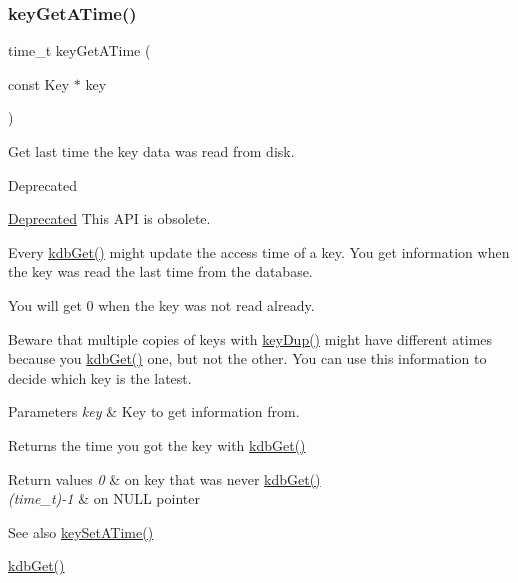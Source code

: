 \subsubsection{\texorpdfstring{keyGetATime()}{keyGetATime()}}
{\footnotesize\ttfamily time\+\_\+t key\+Get\+A\+Time (\begin{DoxyParamCaption}\item[{const Key $\ast$}]{key }\end{DoxyParamCaption})}



Get last time the key data was read from disk. 

\begin{DoxyRefDesc}{Deprecated}
\item[\mbox{\hyperlink{deprecated__deprecated000021}{Deprecated}}]This A\+PI is obsolete.\end{DoxyRefDesc}


Every \mbox{\hyperlink{group__kdb_ga28e385fd9cb7ccfe0b2f1ed2f62453a1}{kdb\+Get()}} might update the access time of a key. You get information when the key was read the last time from the database.

You will get 0 when the key was not read already.

Beware that multiple copies of keys with \mbox{\hyperlink{group__key_gae6ec6a60cc4b8c1463fa08623d056ce3}{key\+Dup()}} might have different atimes because you \mbox{\hyperlink{group__kdb_ga28e385fd9cb7ccfe0b2f1ed2f62453a1}{kdb\+Get()}} one, but not the other. You can use this information to decide which key is the latest.


\begin{DoxyParams}{Parameters}
{\em key} & Key to get information from. \\
\hline
\end{DoxyParams}
\begin{DoxyReturn}{Returns}
the time you got the key with \mbox{\hyperlink{group__kdb_ga28e385fd9cb7ccfe0b2f1ed2f62453a1}{kdb\+Get()}} 
\end{DoxyReturn}

\begin{DoxyRetVals}{Return values}
{\em 0} & on key that was never \mbox{\hyperlink{group__kdb_ga28e385fd9cb7ccfe0b2f1ed2f62453a1}{kdb\+Get()}} \\
\hline
{\em (time\+\_\+t)-\/1} & on N\+U\+LL pointer \\
\hline
\end{DoxyRetVals}
\begin{DoxySeeAlso}{See also}
\mbox{\hyperlink{group__meta_ga995d8b84731673c88c7c01f3fed538b9}{key\+Set\+A\+Time()}} 

\mbox{\hyperlink{group__kdb_ga28e385fd9cb7ccfe0b2f1ed2f62453a1}{kdb\+Get()}} 
\end{DoxySeeAlso}
\mbox{\label{group__meta_gafb89735689929ff717cc9f2d0d0b46a2}} 
